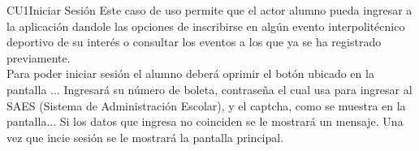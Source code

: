 \begin{UseCase}{CU1}{Iniciar Sesión}{
		\noindent Este caso de uso permite que el actor alumno pueda ingresar a la aplicación dandole las opciones de inscribirse en algún evento interpolitécnico deportivo de su interés o consultar los eventos a los que ya se ha registrado previamente. \\
    	Para poder iniciar sesión el alumno deberá oprimir el botón  ubicado en la pantalla ... Ingresará su número de boleta, contraseña el cual usa para ingresar al SAES (Sistema de Administración Escolar), y el captcha, como se muestra en la pantalla... Si los datos que ingresa no coinciden se le mostrará un mensaje.
        Una vez que incie sesión se le mostrará la pantalla principal.
	} \label{CU1_Iniciarsesion}
		\end{UseCase}
